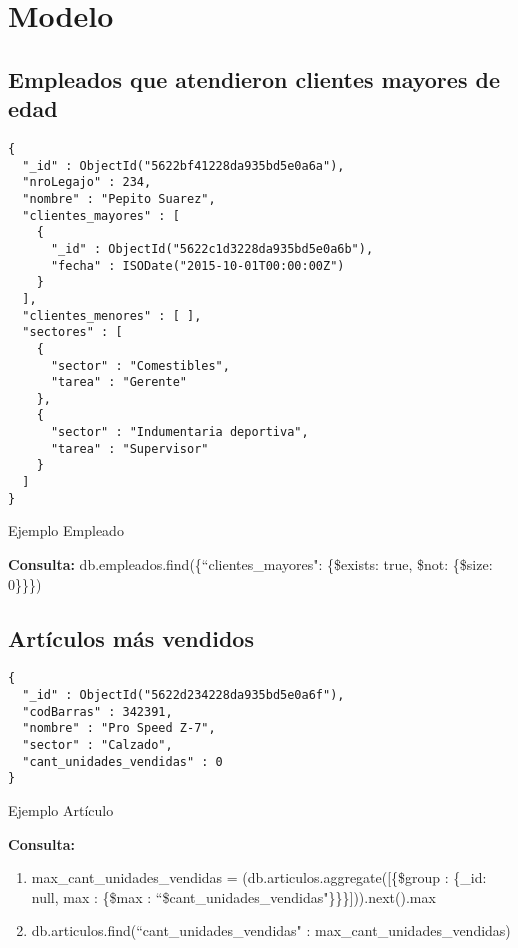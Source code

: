 \section{Modelo}

\subsection{Empleados que atendieron clientes mayores de edad}

\begin{listing}
\begin{verbatim}
{
  "_id" : ObjectId("5622bf41228da935bd5e0a6a"),
  "nroLegajo" : 234,
  "nombre" : "Pepito Suarez",
  "clientes_mayores" : [
    {
      "_id" : ObjectId("5622c1d3228da935bd5e0a6b"),
      "fecha" : ISODate("2015-10-01T00:00:00Z")
    }
  ],
  "clientes_menores" : [ ],
  "sectores" : [
    {
      "sector" : "Comestibles",
      "tarea" : "Gerente"
    },
    {
      "sector" : "Indumentaria deportiva",
      "tarea" : "Supervisor"
    }
  ]
}
\end{verbatim}
\caption{Ejemplo Empleado}
\label{json-example}
\end{listing}

\textbf{Consulta: } db.empleados.find(\{``clientes_mayores": \{\$exists: true, \$not: \{\$size: 0\}\}\})

\vspace{3em}

\subsection{Artículos más vendidos}
\begin{listing}
\begin{verbatim}
{
  "_id" : ObjectId("5622d234228da935bd5e0a6f"),
  "codBarras" : 342391,
  "nombre" : "Pro Speed Z-7",
  "sector" : "Calzado",
  "cant_unidades_vendidas" : 0
}
\end{verbatim}
\caption{Ejemplo Artículo}
\label{json-example}
\end{listing}

\textbf{Consulta: }
\begin{enumerate}
  \item max_cant_unidades_vendidas = (db.articulos.aggregate([\{\$group : \{_id: null, max : \{\$max : ``\$cant_unidades_vendidas"\}\}\}])).next().max
  \item db.articulos.find(``cant_unidades_vendidas" : max_cant_unidades_vendidas)
\end{enumerate}

